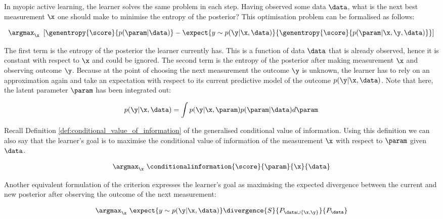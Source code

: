 In myopic active learning, the learner solves the same problem in each step. Having observed some data $\data$, what is the next best measurement $\x$ one should make to minimise the entropy of the posterior? This optimisation problem can be formalised as follows:

\begin{equation}
	\argmax_\x\ \left[ \genentropy{\score}{p(\param\vert\data)} - \expect{y\sim p(\y\vert \x, \data)}{\genentropy{\score}{p(\param\vert \x,\y,\data)} }\right ]
	\label{Eqn:active_learning_optimisation_criterion}
\end{equation}

The first term is the entropy of the posterior the learner currently has. This is a function of data $\data$ that is already observed, hence it is constant with respect to $\x$ and could be ignored. The second term is the entropy of the posterior after making measurement $\x$ and observing outcome $\y$. Because at the point of choosing the next measurement the outcome $\y$ is unknown, the learner has to rely on an approximation again and take an expectation with respect to its current predictive model of the outcome $p(\y \vert \x, \data)$. Note that here, the latent parameter $\param$ has been integrated out:

\begin{equation}
	p(\y \vert \x, \data) = \int p(\y \vert \x, \param) p(\param \vert \data) d\param
\end{equation}

Recall Definition \ref{def:conditional_value_of_information} of the generalised conditional value of information. Using this definition we can also say that the learner's goal is to maximise the conditional value of information of the measurement $\x$ with respect to $\param$ given $\data$.

\begin{equation}
	\argmax_\x\ \conditionalinformation{\score}{\param}{\x}{\data}
\end{equation}

Another equivalent formulation of the criterion expresses the learner's goal as maximising the expected divergence between the current and new posterior after observing the outcome of the next measurement:

\begin{equation}
	\argmax_\x\  \expect{y \sim p(\y\vert \x, \data)}\divergence{S}{P_{\data\cup\{\x,\y\}}}{P_{\data}}
\end{equation}

